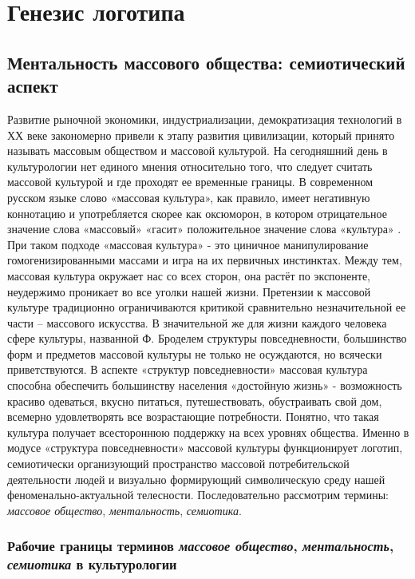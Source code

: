 \section{Генезис логотипа}\label{chapter1}

\subsection{Ментальность массового общества: семиотический аспект}\label{1}
Развитие рыночной экономики, индустриализации, демократизация технологий в ХХ веке закономерно привели к этапу развития цивилизации, который принято называть массовым обществом и массовой культурой. На сегодняшний день в культурологии нет единого мнения относительно того, что следует считать массовой культурой и где проходят ее временные границы. В современном русском языке слово «массовая культура», как правило, имеет негативную коннотацию и употребляется скорее как оксюморон, в котором отрицательное значение слова «массовый» «гасит» положительное значение слова «культура» \autocite{elistratov2012}. При таком подходе «массовая культура» - это циничное манипулирование гомогенизированными массами и игра на их первичных инстинктах. Между тем, массовая культура окружает нас со всех сторон, она растёт по экспоненте, неудержимо проникает во все уголки нашей жизни. Претензии к массовой культуре традиционно ограничиваются критикой сравнительно незначительной ее части – массового искусства. В значительной же для жизни каждого человека сфере культуры, названной Ф. Броделем структуры повседневности, большинство форм и предметов массовой культуры не только не  осуждаются, но всячески приветствуются. В аспекте «структур повседневности» массовая культура способна обеспечить большинству населения «достойную жизнь» - возможность красиво одеваться, вкусно питаться, путешествовать, обустраивать свой дом, всемерно удовлетворять все возрастающие потребности. Понятно, что такая культура получает всестороннюю поддержку на всех уровнях общества. Именно в модусе «структура повседневности» массовой культуры функционирует логотип, семиотически организующий пространство массовой потребительской деятельности людей и визуально формирующий символическую среду нашей феноменально-актуальной телесности. Последовательно рассмотрим термины: \emph{массовое общество}, \emph{ментальность},
\emph{семиотика}\autocite{society}.

\subsubsection{Рабочие границы терминов \emph{массовое общество}, \emph{ментальность}, \emph{семиотика} в культурологии}\label{1.1}
